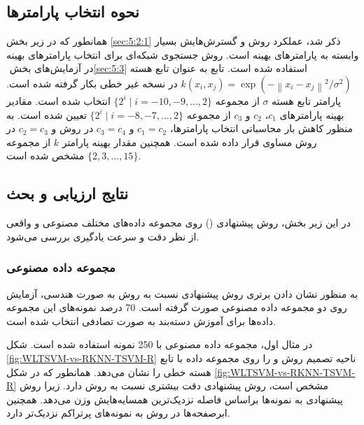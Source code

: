 \subsection{نحوه انتخاب پارامترها}\label{sec:5:3:2}
 همانطور که در زیر بخش \ref{sec:5:2:1} ذکر شد، عملکرد روش  و گسترش‌هایش بسیار وابسته به پارامترهای بهینه است. روش جستجوی شبکه‌ای برای انتخاب پارامترهای بهینه در آزمایش‌های بخش ‏\ref{sec:5:3} استفاده شده است. تابع  به عنوان تابع هسته   $k(x_i, x_j)=\exp({-\left\|x_i - x_j\right\|^2}/\sigma^2)$ در نسخه غیر خطی بکار گرفته شده است. پارامتر تابع هسته  $\sigma$ از مجموعه  $\{2^{i} \mid i=-10,-9,\dots,2 \}$ انتخاب شده است. مقادیر بهینه پارامترهای  $c_{1}$،  $c_{2}$ و   $c_{3}$ از مجموعه   $\{2^{i} \mid i=-8,-7,\dots,2 \}$ تعیین شده است. به منظور کاهش بار محاسباتی انتخاب پارامترها،  $c_{1}=c_{2}$ و  $c_{3}=c_{4}$ در روش   و  $c_{2}=c_{3}$ در روش  مساوی قرار داده شده است. همچنین مقدار بهینه پارامتر  $k$ از مجموعه   $\{2,3,\dots,15\}$ مشخص شده است.
 
\subsection{نتایج ارزیابی و بحث}\label{sec:5:3:3}
 در این زیر بخش، روش پیشنهادی () روی مجموعه داده‌های مختلف مصنوعی و واقعی از نظر دقت و سرعت یادگیری بررسی می‌شود.
 
\subsubsection{مجموعه داده مصنوعی}\label{sec:5:3:3:1}
 به منظور نشان دادن برتری روش پیشنهادی نسبت به روش  به صورت هندسی، آزمایش روی دو مجموعه داده مصنوعی صورت گرفته است. 70 درصد نمونه‌های این مجموعه داده‌ها برای آموزش دسته‌بند به صورت تصادفی انتخاب شده است.
 
 در مثال اول، مجموعه داده مصنوعی  با 250 نمونه استفاده شده است. شکل ‏\ref{fig:WLTSVM-vs-RKNN-TSVM-R} ناحیه تصمیم روش  و  را روی مجموعه داده  با تابع هسته خطی را نشان می‌دهد. همانطور که در شکل \ref{fig:WLTSVM-vs-RKNN-TSVM-R} مشخص است، روش پیشنهادی دقت بیشتری نسبت به روش  دارد. زیرا روش پیشنهادی به نمونه‌ها براساس فاصله نزدیک‌ترین همسایه‌هایش وزن می‌دهد. همچنین ابرصفحه‌ها در روش  به نمونه‌های پرتراکم نزدیک‌تر دارد. 
 
